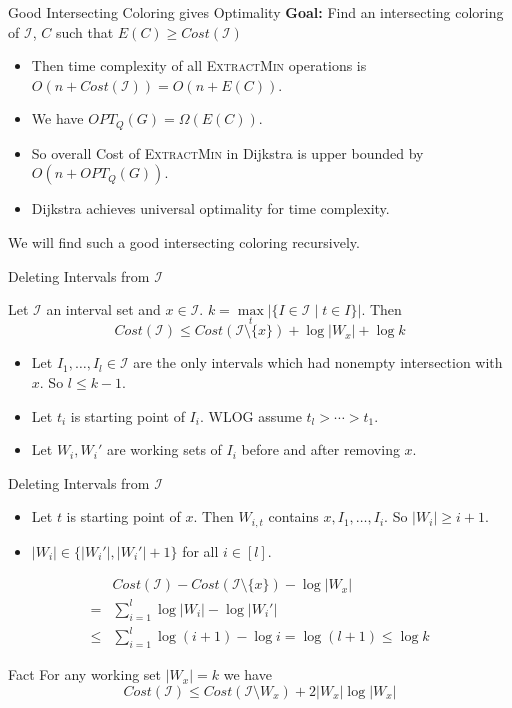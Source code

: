 \documentclass[10pt]{beamer}
\begin{document}
\begin{frame}{Good Intersecting Coloring gives Optimality}
    \textbf{Goal:} Find an intersecting coloring of $\mathcal{I}$, $C$ such that $E(C)\geq Cost(\mathcal{I})$ 

    \begin{itemize}
        \item Then time complexity of all \textsc{ExtractMin} operations is $O(n+Cost(\mathcal{I}))=O(n+E(C))$.
        \item We have  $OPT_Q(G)=\Omega (E(C))$. 
        \item So overall Cost of \textsc{ExtractMin} in Dijkstra is upper bounded by $O(n+OPT_Q(G))$. 
        \item Dijkstra achieves universal optimality for time complexity. 
    \end{itemize}
\vfill

    We will find such a good intersecting coloring recursively.
\end{frame}
\begin{frame}{Deleting Intervals from $\mathcal{I}$}
    \begin{theorem}
        Let $\mathcal{I}$ an interval set and $x\in\mathcal{I}$. $k=\max\limits_t|\{I\in\mathcal{I}\mid t\in I\}|$. Then $$Cost(\mathcal{I})\leq Cost(\mathcal{I}\setminus \{x\})+\log |W_x|+\log k$$
    \end{theorem}\vfill

    \begin{itemize}
      \item Let $I_1,\dots, I_l\in\mathcal{I}$ are the only intervals which had nonempty intersection with $x$. So $l\leq k-1$.\vfill 
      \item Let $t_i$ is starting point of $I_i$. WLOG assume $t_l>\cdots>t_1$.\vfill 
      \item Let $W_i, W_i'$ are working sets of $I_i$ before and after removing $x$. 
    \end{itemize}
\end{frame}
\begin{frame}{Deleting Intervals from $\mathcal{I}$}
  \begin{itemize}
    \item Let $t$ is starting point of $x$. Then $W_{i,t}$ contains $x, I_1,\dots, I_i$. So $|W_i|\geq i+1$.
    \item $|W_i|\in\{|W_i'|,|W_i'|+1\}$ for all $i\in[l]$.
  \end{itemize}
     \begin{align*}
         &Cost(\mathcal{I})-Cost(\mathcal{I}\setminus \{x\})-\log |W_x|  \\ 
         =& \sum\limits_{i=1}^l \log|W_i|-\log|W_i'| \\ 
         \leq &  \sum\limits_{i=1}^l \log(i+1)-\log i =\log (l+1) \leq \log k
     \end{align*}

      \begin{alertblock}{Fact}
		For any working set $|W_x|=k$ we have $$Cost(\mathcal{I})\leq Cost(\mathcal{I}\setminus W_x)+2|W_x|\log |W_x|$$
	\end{alertblock}
\end{frame}
\end{document}
